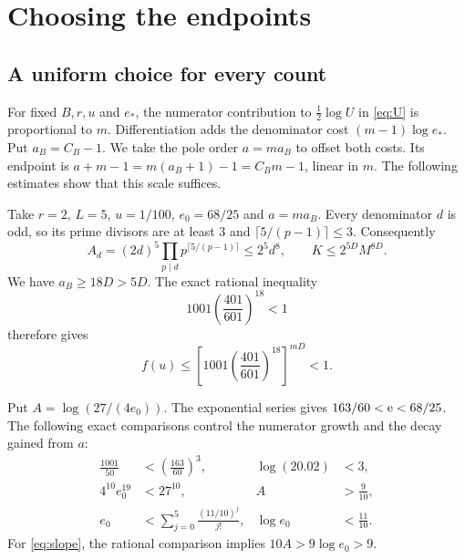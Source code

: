 \section{Choosing the endpoints}\label{sec:endpoints}

\subsection{A uniform choice for every count}

For fixed $B,r,u$ and $e_*$, the numerator contribution to
$\tfrac12\log U$ in \eqref{eq:U} is proportional to $m$.
Differentiation adds the denominator cost $(m-1)\log e_*$.
Put $a_B=C_B-1$. We take the pole order $a=ma_B$ to offset
both costs. Its endpoint is
$a+m-1=m(a_B+1)-1=C_Bm-1$, linear in $m$.
The following estimates show that this scale suffices.

Take $r=2$, $L=5$, $u=1/100$, $e_0=68/25$ and $a=ma_B$.
Every denominator $d$ is odd, so its prime divisors are at
least $3$ and $\lceil5/(p-1)\rceil\le3$. Consequently
\begin{equation}\label{eq:K-bound}
 A_d=(2d)^5\prod_{p\mid d}p^{\lceil5/(p-1)\rceil}
       \le2^5d^8,\qquad
 K\le2^{5D}M^{8D}.
\end{equation}
We have $a_B\ge18D>5D$. The exact rational inequality
\begin{equation}\label{eq:f18}
 1001\left(\frac{401}{601}\right)^{18}<1
\end{equation}
therefore gives
\[
 f(u)\le
 \left[1001\left(\frac{401}{601}\right)^{18}\right]^{mD}<1.
\]

Put $A=\log(27/(4e_0))$. The exponential series gives
$163/60<\mathrm e<68/25$. The following exact comparisons control
the numerator growth and the decay gained from $a$:
\begin{align}
 \frac{1001}{50}&<\left(\frac{163}{60}\right)^3,
       &\log(20.02)&<3,\label{eq:log20}\\
 4^{10}e_0^{19}&<27^{10},
       &A&>\frac9{10},\label{eq:slope}\\
 e_0&<\sum_{j=0}^5\frac{(11/10)^j}{j!},
       &\log e_0&<\frac{11}{10}.\label{eq:log-e0}
\end{align}
For \eqref{eq:slope}, the rational comparison implies
$10A>9\log e_0>9$.

